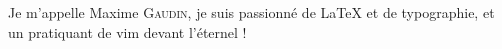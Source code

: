Je m'appelle Maxime \textsc{Gaudin}, je suis passionné de \LaTeX{} et de
typographie, et un pratiquant de vim devant l'éternel !
